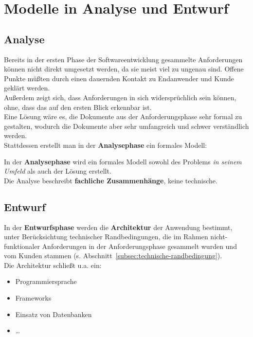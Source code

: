 \section{Modelle in Analyse und Entwurf}

\subsection*{Analyse}



\noindent
Bereits in der ersten Phase der Softwareentwicklung gesammelte Anforderungen können nicht direkt umgesetzt werden, da sie meist viel zu ungenau sind.
Offene Punkte müßten durch einen dauernden Kontakt zu Endanwender und Kunde geklärt werden.\\
Außerdem zeigt sich, dass Anforderungen in sich widersprüchlich sein können, ohne, dass das auf den ersten Blick erkennbar ist.\\

\noindent
Eine Lösung wäre es, die Dokumente aus der Anforderungsphase sehr formal zu gestalten, wodurch die Dokumente aber sehr umfangreich und schwer verständlich werden.\\

\noindent
Stattdessen erstellt man in der \textbf{Analysephase} ein formales Modell:

\vspace{2mm}
\begin{tcolorbox}
    In der \textbf{Analysephase} wird ein formales Modell sowohl des Problems \textit{in seinem Umfeld} als auch der Lösung erstellt.\\
    Die Analyse beschreibt \textbf{fachliche Zusammenhänge}, keine technische.
\end{tcolorbox}
\vspace{2mm}


\subsection*{Entwurf}
In der \textbf{Entwurfsphase} werden die \textbf{Architektur} der Anwendung bestimmt, unter Berücksichtung technischer Randbedingungen, die im Rahmen nicht-funktionaler Anforderungen in der Anforderungsphase gesammelt wurden und vom Kunden stammen (s. Abschnitt~\ref{subsec:technische-randbedingung}).\\
Die Architektur schließt u.a. ein:

\begin{itemize}
    \item Programmiersprache
    \item Frameworks
    \item Einsatz von Datenbanken
    \item \ldots
\end{itemize}

